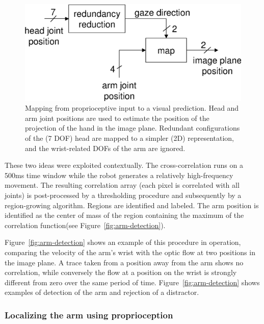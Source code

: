 \ifverbose
\begin{figure}[tb]
\begin{center}
\includegraphics[width=\columnwidth]{mapping-reach.eps}
\caption{ 
\label{fig:mapping-reach}
%
Mapping from proprioceptive input to a visual prediction. Head and arm
joint positions are used to estimate the position of the projection of
the hand in the image plane.  Redundant configurations of the (7 DOF)
head are mapped to a simpler (2D) representation, and the wrist-related 
DOFs of the arm are ignored.
%
}
\end{center}
\end{figure}
\endif
\fi

\ifverbose
These two ideas were exploited contextually. The cross-correlation
runs on a 500ms time window while the robot generates a relatively
high-frequency movement. The resulting correlation array (each pixel
is correlated with all joints) is post-processed by a thresholding
procedure and subsequently by a region-growing algorithm. Regions are
identified and labeled. The arm position is identified as the center
of mass of the region containing the maximum of the correlation
function\iflong (see Figure~\ref{fig:arm-detection})\fi.
\fi

Figure~\ref{fig:arm-detection} shows an example of this procedure
in operation, comparing the velocity of the arm's wrist with the optic
flow at two positions in the image plane.  A trace taken from a
position away from the arm shows no correlation, while conversely the
flow at a position on the wrist is strongly different from zero over
the same period of time.  Figure~\ref{fig:arm-detection} shows
examples of detection of the arm and rejection of a distractor.


\subsubsection*{Localizing the arm using proprioception}

